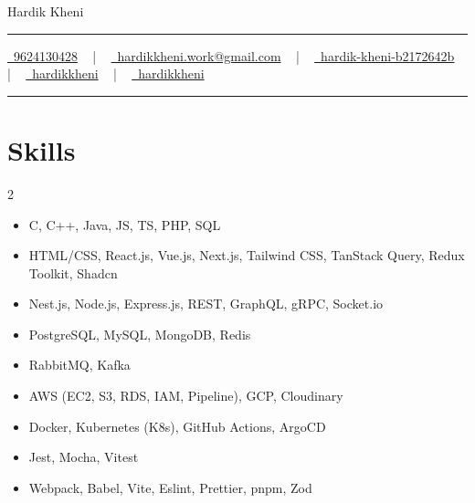 \documentclass[letterpaper,10pt]{article}
\newcommand{\documentTitle}[2]{
  \begin{center}
    {\Huge\color{accentTitle} #1}
    \vspace{10pt}
    {\color{accentLine} \hrule}
    \vspace{2pt}
    \footnotesize{#2}
    \vspace{2pt}
    {\color{accentLine} \hrule}
  \end{center}
}
\newcommand{\tinysection}[1]{
  \phantomsection
  \addcontentsline{toc}{section}{#1}
  {\large{\bfseries\color{accentText}#1} {\color{accentLine} |}}
}
\begin{document}

  \documentTitle{Hardik Kheni}{
    \href{tel:9624130428}{
      \raisebox{-0.05\height} \faPhone\ 9624130428} ~ | ~
    \href{mailto:hardikkheni.work@gmail.com}{
      \raisebox{-0.15\height} \faEnvelope\ hardikkheni.work@gmail.com} ~ | ~
    \href{https://www.linkedin.com/in/hardik-kheni-b2172642b/}{
      \raisebox{-0.15\height} \faLinkedin\ hardik-kheni-b2172642b} ~ | ~
    \href{https://github.com/hardikkheni}{
      \raisebox{-0.15\height} \faGithub\ hardikkheni} ~ | ~
     \href{https://leetcode.com/u/hardikkheni/}{
      \raisebox{-0.15\height} \faCode\ hardikkheni}
  }




  \section{Skills}

  \begin{multicols}{2}
    \begin{itemize}[itemsep=-2px, parsep=1pt, leftmargin=75pt]
        \item[\textbf{Languages}] C, C++, Java, JS, TS, PHP, SQL
        \item[\textbf{Frontend}] HTML/CSS, React.js, Vue.js, Next.js, Tailwind CSS, TanStack Query, Redux Toolkit, Shadcn
        \item[\textbf{Backend}] Nest.js, Node.js, Express.js, REST, GraphQL, gRPC, Socket.io
        \item[\textbf{Databases}] PostgreSQL, MySQL, MongoDB, Redis
        \item[\textbf{Messaging}] RabbitMQ, Kafka
        \item[\textbf{Cloud}] AWS (EC2, S3, RDS, IAM, Pipeline), GCP, Cloudinary
        \item[\textbf{DevOps}] Docker, Kubernetes (K8s), GitHub Actions, ArgoCD
        \item[\textbf{Testing}] Jest, Mocha, Vitest
        \item[\textbf{Tools}] Webpack, Babel, Vite, Eslint, Prettier, pnpm, Zod
    \end{itemize}
  \end{multicols}
\end{document}
